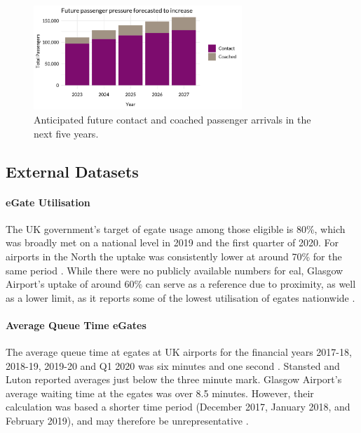 \documentclass[10pt]{article}
\begin{document}
\begin{figure}[!ht]
    \centering
    \includegraphics[width=0.7\textwidth]{figures/future_passenger_burden_fig.png}
     \caption{Anticipated future contact and coached passenger arrivals in the next five years.  } \label{fig:future_passenger_burden}
\end{figure}

\subsection{External Datasets}

\paragraph{eGate Utilisation}
The UK government's target of \gls{egate} usage among those eligible is 80\%, which was broadly met on a national level in 2019 and the first quarter of 2020. For airports in the North the uptake was consistently lower at around 70\% for the same period \cite{Inspection_eGates}. While there were no publicly available numbers for \gls{eal}, Glasgow Airport's uptake of around 60\% can serve as a reference due to proximity, as well as a lower limit, as it reports some of the lowest utilisation of \glspl{egate} nationwide \cite{Inspection_eGates}. 

\paragraph{Average Queue Time eGates}
The average queue time at \glspl{egate} at UK airports for the financial years 2017-18, 2018-19, 2019-20 and Q1 2020 was six minutes and one second \cite{Inspection_eGates}. Stansted and Luton reported averages just below the three minute mark. Glasgow Airport's average waiting time at the \glspl{egate} was over 8.5 minutes. However, their calculation was based a shorter time period (December 2017, January 2018, and February 2019), and may therefore be unrepresentative \cite{Inspection_eGates}.
\end{document}
